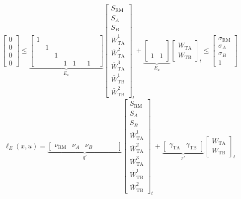 \begin{equation}
\label{eq:scheduling:ABconst}
\begin{bmatrix} 0 \\ 0 \\ 0\\ 0 \end{bmatrix} \leq
\underbrace{
\begin{bmatrix}
1& & & & & & & \\
 &1& & & & & & \\
 & &1& & & & & \\
 & & &1&1& &1& \end{bmatrix}   
}_{E_x}
\begin{bmatrix}S_{\text{RM}}\\S_A\\S_B\\
\bar{W}_{\text{TA}}^1\\\bar{W}_{\text{TA}}^2\\
\bar{W}_{\text{TA}}^3\\\bar{W}_{\text{TB}}^1\\
\bar{W}_{\text{TB}}^2\end{bmatrix}_{t}+
\underbrace{
\begin{bmatrix}
 & \\
 & \\
 & \\
1& 1 \end{bmatrix}
}_{E_u}\begin{bmatrix}W_{\text{TA}}
    \\W_{\text{TB}}\end{bmatrix}_{t} \leq 
\begin{bmatrix}\sigma_{\text{RM}}\\\sigma_{A}\\
\sigma_{B}\\1\end{bmatrix}
\end{equation}
\begin{equation}
\label{eq:scheduling:ABstage_cost}
\ell_E(x,u)
= \underbrace{\begin{bmatrix}\nu_{\text{RM}} & \nu_A & \nu_B & & &
  & \end{bmatrix}}_{q'}\begin{bmatrix}S_{\text{RM}}\\
S_A\\S_B\\\bar{W}_{\text{TA}}^1\\  
\bar{W}_{\text{TA}}^2\\\bar{W}_{\text{TA}}^3\\
\bar{W}_{\text{TB}}^1\\\bar{W}_{\text{TB}}^2\end{bmatrix}_{t}+   
\underbrace{\begin{bmatrix}\gamma_{\text{TA}} 
  & \gamma_{\text{TB}} \end{bmatrix}}_{r'}\begin{bmatrix}W_{\text{TA}}
    \\W_{\text{TB}}\end{bmatrix}_{t}
\end{equation}

